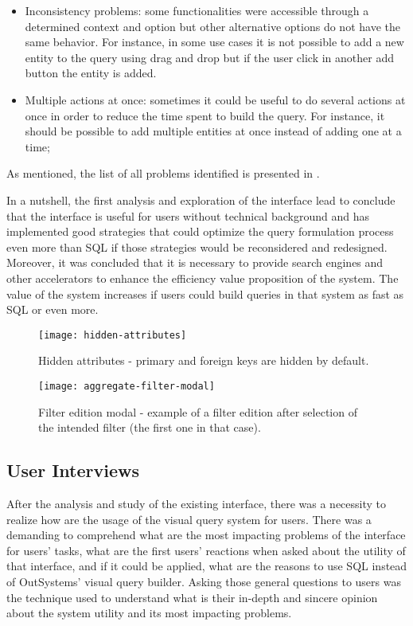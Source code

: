 \begin{itemize}
    \item Inconsistency problems: some functionalities were accessible through a determined context and option but other alternative options do not have the same behavior. For instance, in some use cases it is not possible to add a new entity to the query using drag and drop but if the user click in another add button the entity is added.
    \item Multiple actions at once: sometimes it could be useful to do several actions at once in order to reduce the time spent to build the query. For instance, it should be possible to add multiple entities at once instead of adding one at a time; 
\end{itemize}

As mentioned, the list of all problems identified is presented in .

In a nutshell, the first analysis and exploration of the interface lead to conclude that the interface is useful for users without technical background and has implemented good strategies that could optimize the query formulation process even more than \gls{SQL} if those strategies would be reconsidered and redesigned. Moreover, it was concluded that it is necessary to provide search engines and other accelerators to enhance the efficiency value proposition of the system. The value of the system increases if users could build queries in that system as fast as \gls{SQL} or even more.

\begin{figure}[htbp]
	\centering
	\texttt{[image: hidden-attributes]}
	\caption{Hidden attributes - primary and foreign keys are hidden by default.}
	\label{fig:hiddenAttributes}
\end{figure}

\begin{figure}[htbp]
	\centering
	\texttt{[image: aggregate-filter-modal]}
	\caption{Filter edition modal - example of a filter edition after selection of the intended filter (the first one in that case).}
	\label{fig:aggregateFilterModal}
\end{figure}

\subsection{User Interviews}
\label{subsec:user_interviews}

After the analysis and study of the existing interface, there was a necessity to realize how are the usage of the visual query system for users. There was a demanding to comprehend what are the most impacting problems of the interface for users' tasks, what are the first users' reactions when asked about the utility of that interface, and if it could be applied, what are the reasons to use \gls{SQL} instead of OutSystems' visual query builder. Asking those general questions to users was the technique used to understand what is their in-depth and sincere opinion about the system utility and its most impacting problems.

